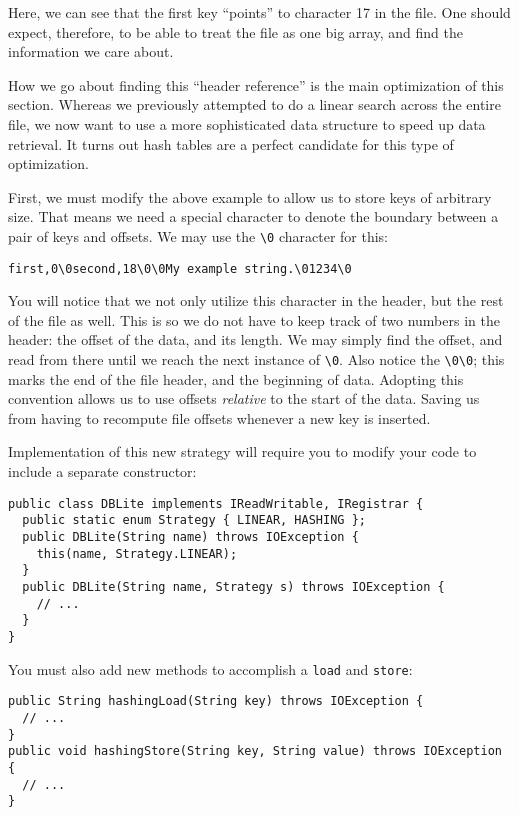 \documentclass{article}
\begin{document}
Here, we can see that the first key ``points'' to character 17 in the file.
One should expect, therefore, to be able to treat the file as one big array,
and find the information we care about.

How we go about finding this ``header reference'' is the main optimization of
this section.  Whereas we previously attempted to do a linear search across the
entire file, we now want to use a more sophisticated data structure to speed up
data retrieval.  It turns out hash tables are a perfect candidate for this type
of optimization.

First, we must modify the above example to allow us to store keys of arbitrary
size.  That means we need a special character to denote the boundary between a
pair of keys and offsets.  We may use the \texttt{\textbackslash0} character
for this:

\begin{verbatim}
first,0\0second,18\0\0My example string.\01234\0
\end{verbatim}

You will notice that we not only utilize this character in the header, but the
rest of the file as well.  This is so we do not have to keep track of two
numbers in the header: the offset of the data, and its length.  We may simply
find the offset, and read from there until we reach the next instance of
\texttt{\textbackslash0}.  Also notice the
\texttt{\textbackslash0\textbackslash0}; this marks the end of the file header,
and the beginning of data.  Adopting this convention allows us to use offsets
{\em relative} to the start of the data.  Saving us from having to recompute
file offsets whenever a new key is inserted.

Implementation of this new strategy will require you to modify your code to
include a separate constructor:

\begin{verbatim}
public class DBLite implements IReadWritable, IRegistrar {
  public static enum Strategy { LINEAR, HASHING };
  public DBLite(String name) throws IOException {
    this(name, Strategy.LINEAR);
  }
  public DBLite(String name, Strategy s) throws IOException {
    // ... 
  }
}
\end{verbatim}

You must also add new methods to accomplish a \texttt{load} and \texttt{store}:

\begin{verbatim}
public String hashingLoad(String key) throws IOException {
  // ...
}
public void hashingStore(String key, String value) throws IOException {
  // ...
}
\end{verbatim}
\end{document}
